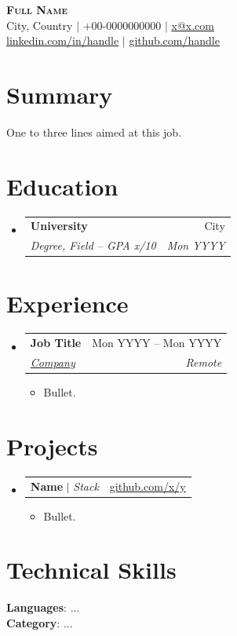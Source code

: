 \documentclass[a4paper,11pt]{article}
\makeatletter
\newcommand{\resumeItem}[1]{
  \item\small{
    {#1 \vspace{-2pt}}
  }
}
\newcommand{\resumeSubheading}[4]{
  \vspace{-2pt}\item
    \begin{tabular*}{0.97\textwidth}[t]{l@{\extracolsep{\fill}}r}
      \textbf{#1} & #2 \\
      \textit{\small#3} & \textit{\small #4} \\
    \end{tabular*}\vspace{-7pt}
}
\newcommand{\resumeProjectHeading}[2]{
    \item
    \begin{tabular*}{0.97\textwidth}{l@{\extracolsep{\fill}}r}
      \small#1 & #2 \\
    \end{tabular*}\vspace{-7pt}
}
\newcommand{\resumeSubHeadingListStart}{\begin{itemize}[leftmargin=0.15in, label={}]}
\newcommand{\resumeSubHeadingListEnd}{\end{itemize}}
\newcommand{\resumeItemListStart}{\begin{itemize}}
\newcommand{\resumeItemListEnd}{\end{itemize}\vspace{-5pt}}
\makeatother
\begin{document}
\begin{center}
    \textbf{\Huge \scshape Full Name} \\ \vspace{1pt}
    \small City, Country $|$ +00-0000000000 $|$ \href{mailto:x@x.com}{\underline{x@x.com}} \\
    \href{https://linkedin.com/in/handle}{\underline{linkedin.com/in/handle}} $|$
    \href{https://github.com/handle}{\underline{github.com/handle}}
\end{center}

\section{Summary}
\small{One to three lines aimed at this job.}

\section{Education}
  \resumeSubHeadingListStart
    \resumeSubheading
      {University}{City}
      {Degree, Field -- GPA x/10}{Mon YYYY}
  \resumeSubHeadingListEnd

\section{Experience}
  \resumeSubHeadingListStart
    \resumeSubheading
      {Job Title}{Mon YYYY -- Mon YYYY}
      {\href{https://company.example}{Company}}{Remote}
      \resumeItemListStart
        \resumeItem{Bullet.}
      \resumeItemListEnd
  \resumeSubHeadingListEnd

\section{Projects}
    \resumeSubHeadingListStart
      \resumeProjectHeading
          {\textbf{Name} $|$ \emph{Stack}}{\href{https://github.com/x/y}{github.com/x/y}} %
          \resumeItemListStart
            \resumeItem{Bullet.}
          \resumeItemListEnd
    \resumeSubHeadingListEnd

\section{Technical Skills}
 \begin{itemize}[leftmargin=0.15in, label={}]
    \small{\item{
     \textbf{Languages}{: ...} \\
     \textbf{Category}{: ...}
    }}
 \end{itemize}
\end{document}
